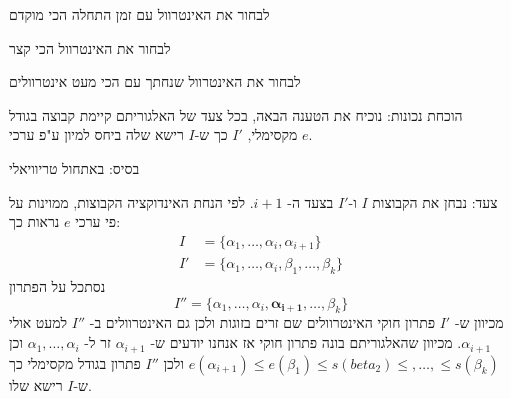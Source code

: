 לבחור את האינטרוול עם זמן התחלה הכי מוקדם
\begin{center}
\end{center}

לבחור את האינטרוול הכי קצר
\begin{center}
\end{center}

לבחור את האינטרוול שנחתך עם הכי מעט אינטרוולים
\begin{center}
\end{center}


הוכחת נכונות: נוכיח את הטענה הבאה, בכל צעד של האלגוריתם קיימת קבוצה בגודל מקסימלי, 
$I'$
כך ש-$I$ רישא שלה ביחס למיון ע"פ ערכי $e$.

בסיס: באתחול טריוויאלי

צעד: נבחן את הקבוצות $I$ ו-$I'$ בצעד ה-%
$i + 1$.
לפי הנחת האינדוקציה הקבוצות, ממוינות על פי ערכי $e$ נראות כך:
$$
\begin{array}{ll}
I & = \{\alpha_1, \ldots, \alpha_i, \alpha_{i+1}\}
\\
I' & = \{\alpha_1, \ldots, \alpha_i, \beta_1, \ldots, \beta_k\}
\end{array}
$$
נסתכל על הפתרון
$$
I'' =  \{\alpha_1, \ldots, \alpha_i, \bm{\alpha_{i+1}}, \ldots, \beta_k\}
$$
מכיוון ש-%
$I'$
פתרון חוקי האינטרוולים שם זרים בזוגות ולכן גם האינטרוולים ב-%
$I''$
למעט אולי 
$\alpha_{i+1}$.
מכיוון שהאלגוריתם בונה פתרון חוקי אז אנחנו יודעים ש-%
$\alpha_{i+1}$
זר ל-%
$\alpha_1, \ldots, \alpha_i$
וכן 
$e(\alpha_{i+1}) \leq e(\beta_1) \leq s(beta_2) \leq, \ldots, \leq s(\beta_k)$
ולכן 
$I''$
פתרון בגודל מקסימלי כך ש-$I$ רישא שלו.
